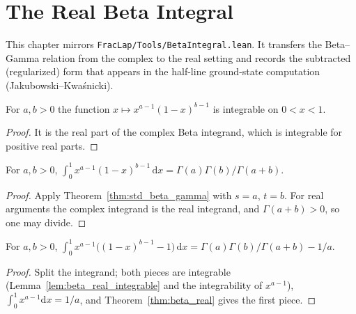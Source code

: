 \chapter{The Real Beta Integral}

This chapter mirrors \texttt{FracLap/Tools/BetaIntegral.lean}. It transfers the Beta--Gamma relation from the complex to the real setting and records the subtracted (regularized) form that appears in the half-line ground-state computation (Jakubowski--Kwa\'snicki).

\begin{lemma}\label{lem:beta_real_integrable}
\leanok
For $a, b > 0$ the function $x \mapsto x^{a-1}(1-x)^{b-1}$ is integrable on $0 < x < 1$.
\end{lemma}

\begin{proof}
\leanok
It is the real part of the complex Beta integrand, which is integrable for positive real parts.
\end{proof}

\begin{theorem}\label{thm:beta_real}
\leanok
For $a, b > 0$, $\int_0^1 x^{a-1} (1-x)^{b-1}\, \mathrm{d}x = \Gamma(a)\Gamma(b)/\Gamma(a+b)$.
\end{theorem}

\begin{proof}
\leanok
Apply Theorem~\ref{thm:std_beta_gamma} with $s = a$, $t = b$. For real arguments the complex integrand is the real integrand, and $\Gamma(a+b) > 0$, so one may divide.
\end{proof}

\begin{theorem}\label{thm:beta_subtracted}
\leanok
For $a, b > 0$, $\int_0^1 x^{a-1}\bigl((1-x)^{b-1} - 1\bigr)\, \mathrm{d}x = \Gamma(a)\Gamma(b)/\Gamma(a+b) - 1/a$.
\end{theorem}

\begin{proof}
\leanok
Split the integrand; both pieces are integrable (Lemma~\ref{lem:beta_real_integrable} and the integrability of $x^{a-1}$), $\int_0^1 x^{a-1} \mathrm{d}x = 1/a$, and Theorem~\ref{thm:beta_real} gives the first piece.
\end{proof}

